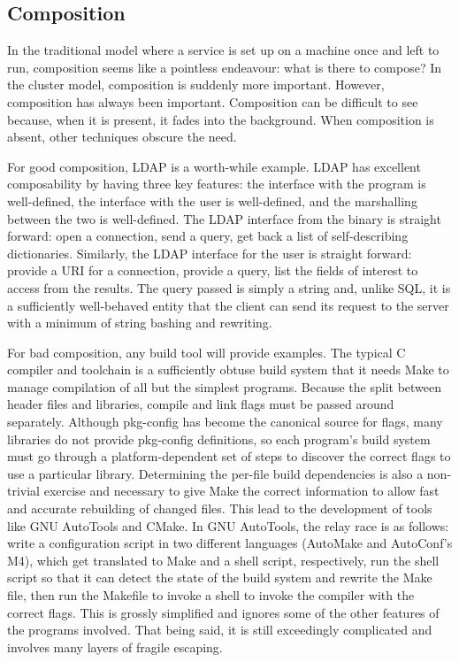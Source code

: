 \documentclass[letterpaper,twocolumn,10pt]{article}
\begin{document}
\subsection{Composition}
In the traditional model where a service is set up on a machine once and left to run, composition seems like a pointless endeavour: what is there to compose? In the cluster model, composition is suddenly more important. However, composition has always been important. Composition can be difficult to see because, when it is present, it fades into the background. When composition is absent, other techniques obscure the need.

For good composition, LDAP is a worth-while example. LDAP has excellent composability by having three key features: the interface with the program is well-defined, the interface with the user is well-defined, and the marshalling between the two is well-defined. The LDAP interface from the binary is straight forward: open a connection, send a query, get back a list of self-describing dictionaries. Similarly, the LDAP interface for the user is straight forward: provide a URI for a connection, provide a query, list the fields of interest to access from the results. The query passed is simply a string and, unlike SQL, it is a sufficiently well-behaved entity that the client can send its request to the server with a minimum of string bashing and rewriting.

For bad composition, any build tool will provide examples. The typical C compiler and toolchain is a sufficiently obtuse build system that it needs Make to manage compilation of all but the simplest programs. Because the split between header files and libraries, compile and link flags must be passed around separately. Although pkg-config has become the canonical source for flags, many libraries do not provide pkg-config definitions, so each program's build system must go through a platform-dependent set of steps to discover the correct flags to use a particular library. Determining the per-file build dependencies is also a non-trivial exercise and necessary to give Make the correct information to allow fast and accurate rebuilding of changed files. This lead to the development of tools like GNU AutoTools and CMake. In GNU AutoTools, the relay race is as follows: write a configuration script in two different languages (AutoMake and AutoConf's M4), which get translated to Make and a shell script, respectively, run the shell script so that it can detect the state of the build system and rewrite the Make file, then run the Makefile to invoke a shell to invoke the compiler with the correct flags. This is grossly simplified and ignores some of the other features of the programs involved. That being said, it is still exceedingly complicated and involves many layers of fragile escaping.
\end{document}
